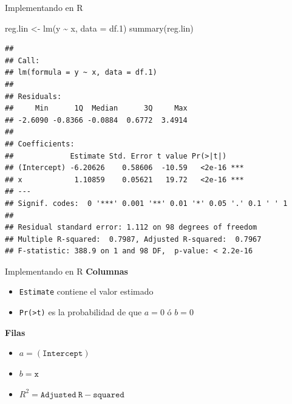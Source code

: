 \documentclass[
  11pt,
  ignorenonframetext,
]{beamer}
\newenvironment{Shaded}{}{}
\newcommand{\AttributeTok}[1]{\textcolor[rgb]{0.49,0.56,0.16}{#1}}
\newcommand{\FloatTok}[1]{\textcolor[rgb]{0.25,0.63,0.44}{#1}}
\newcommand{\FunctionTok}[1]{\textcolor[rgb]{0.02,0.16,0.49}{#1}}
\newcommand{\NormalTok}[1]{#1}
\newcommand{\OtherTok}[1]{\textcolor[rgb]{0.00,0.44,0.13}{#1}}
\newcommand{\SpecialCharTok}[1]{\textcolor[rgb]{0.25,0.44,0.63}{#1}}
\begin{document}
\begin{frame}[fragile]{Implementando en R}
\protect\hypertarget{implementando-en-r-1}{}
\begin{Shaded}
\begin{Highlighting}[]
\NormalTok{reg.lin }\OtherTok{\textless{}{-}} \FunctionTok{lm}\NormalTok{(y }\SpecialCharTok{\textasciitilde{}}\NormalTok{ x, }\AttributeTok{data =}\NormalTok{ df}\FloatTok{.1}\NormalTok{)}
\FunctionTok{summary}\NormalTok{(reg.lin)}
\end{Highlighting}
\end{Shaded}

\begin{verbatim}
## 
## Call:
## lm(formula = y ~ x, data = df.1)
## 
## Residuals:
##     Min      1Q  Median      3Q     Max 
## -2.6090 -0.8366 -0.0884  0.6772  3.4914 
## 
## Coefficients:
##             Estimate Std. Error t value Pr(>|t|)    
## (Intercept) -6.20626    0.58606  -10.59   <2e-16 ***
## x            1.10859    0.05621   19.72   <2e-16 ***
## ---
## Signif. codes:  0 '***' 0.001 '**' 0.01 '*' 0.05 '.' 0.1 ' ' 1
## 
## Residual standard error: 1.112 on 98 degrees of freedom
## Multiple R-squared:  0.7987, Adjusted R-squared:  0.7967 
## F-statistic: 388.9 on 1 and 98 DF,  p-value: < 2.2e-16
\end{verbatim}
\end{frame}

\begin{frame}[fragile]{Implementando en R}
\protect\hypertarget{implementando-en-r-2}{}
\textbf{Columnas}

\begin{itemize}
\item
  \texttt{Estimate} contiene el valor estimado
\item
  \texttt{Pr(\textgreater{}\textbar{}t\textbar{})} es la probabilidad de
  que \(a = 0\) ó \(b=0\)
\end{itemize}

\textbf{Filas}

\begin{itemize}
\item
  \(a = \mathtt{(Intercept)}\)
\item
  \(b = \mathtt{x}\)
\item
  \(R^2 = \mathtt{Adjusted\ R-squared}\)
\end{itemize}
\end{frame}
\end{document}
